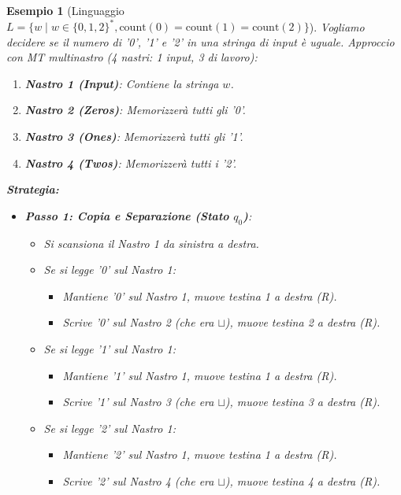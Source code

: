 \documentclass[a4paper]{article}
\newtheorem{example}{Esempio}
\begin{document}
\begin{example}[Linguaggio $L = \{w \mid w \in \{0,1,2\}^*, \text{count}(0)=\text{count}(1)=\text{count}(2)\}$]
Vogliamo decidere se il numero di '0', '1' e '2' in una stringa di input è uguale.
Approccio con MT multinastro (4 nastri: 1 input, 3 di lavoro):
\begin{enumerate}
    \item \textbf{Nastro 1 (Input)}: Contiene la stringa $w$.
    \item \textbf{Nastro 2 (Zeros)}: Memorizzerà tutti gli '0'.
    \item \textbf{Nastro 3 (Ones)}: Memorizzerà tutti gli '1'.
    \item \textbf{Nastro 4 (Twos)}: Memorizzerà tutti i '2'.
\end{enumerate}
\textbf{Strategia:}
\begin{itemize}
    \item \textbf{Passo 1: Copia e Separazione (Stato $q_0$)}:
        \begin{itemize}
            \item Si scansiona il Nastro 1 da sinistra a destra.
            \item Se si legge '0' sul Nastro 1:
                \begin{itemize}
                    \item Mantiene '0' sul Nastro 1, muove testina 1 a destra (R).
                    \item Scrive '0' sul Nastro 2 (che era $\sqcup$), muove testina 2 a destra (R).
                \end{itemize}
            \item Se si legge '1' sul Nastro 1:
                \begin{itemize}
                    \item Mantiene '1' sul Nastro 1, muove testina 1 a destra (R).
                    \item Scrive '1' sul Nastro 3 (che era $\sqcup$), muove testina 3 a destra (R).
                \end{itemize}
            \item Se si legge '2' sul Nastro 1:
                \begin{itemize}
                    \item Mantiene '2' sul Nastro 1, muove testina 1 a destra (R).
                    \item Scrive '2' sul Nastro 4 (che era $\sqcup$), muove testina 4 a destra (R).
                \end{itemize}

\end{itemize}
\end{itemize}
\end{example}
\end{document}
